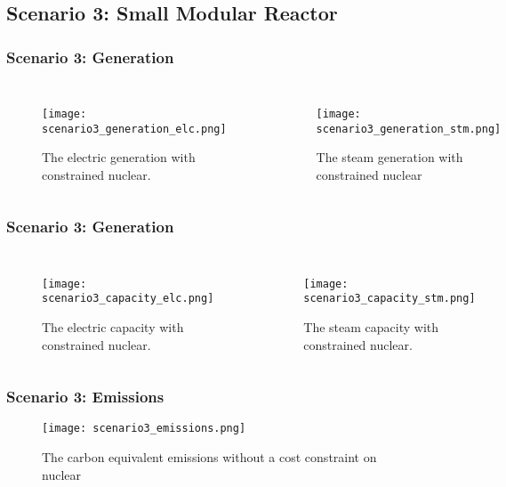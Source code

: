 \subsection{Scenario 3: Small Modular Reactor}
\begin{frame}
  \frametitle{Scenario 3: Generation}
  \begin{columns}
    \column[t]{5cm}
    \begin{figure}
      \texttt{[image: scenario3\_generation\_elc.png]}
      \caption{The electric generation with constrained nuclear.}
      \label{fig:gen03elc}
    \end{figure}
    \column[t]{5cm}
    \begin{figure}
      \texttt{[image: scenario3\_generation\_stm.png]}
      \caption{The steam generation with constrained nuclear}
      \label{fig:gen02stm}
    \end{figure}
  \end{columns}
\end{frame}
\begin{frame}
  \frametitle{Scenario 3: Generation}
  \begin{columns}
    \column[t]{5cm}
    \begin{figure}
      \texttt{[image: scenario3\_capacity\_elc.png]}
      \caption{The electric capacity with constrained nuclear.}
      \label{fig:cap03elc}
    \end{figure}
    \column[t]{5cm}
    \begin{figure}
      \texttt{[image: scenario3\_capacity\_stm.png]}
      \caption{The steam capacity with constrained nuclear.}
      \label{fig:cap02stm}
    \end{figure}
  \end{columns}
\end{frame}
\begin{frame}
  \frametitle{Scenario 3: Emissions}
  \begin{figure}
    \texttt{[image: scenario3\_emissions.png]}
    \caption{The carbon equivalent emissions without a cost constraint on nuclear}
    \label{fig:emit03}
  \end{figure}
\end{frame}
